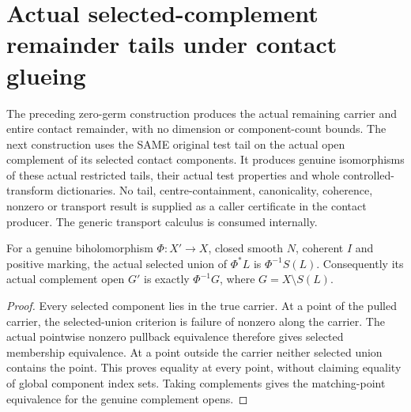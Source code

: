 \section{Actual selected-complement remainder tails under contact glueing}

The preceding zero-germ construction produces the actual remaining carrier
and entire contact remainder, with no dimension or component-count bounds.
The next construction uses the SAME original test tail on the actual open
complement of its selected contact components. It produces genuine isomorphisms
of these actual restricted tails, their actual test properties and whole
controlled-transform dictionaries. No tail, centre-containment, canonicality,
coherence, nonzero or transport result is supplied as a caller certificate
in the contact producer. The generic transport calculus is consumed internally.

\begin{theorem}
\label{hir:zero-contact-tail-selected-complement}
\leanok
{}
For a genuine biholomorphism $\Phi:X'\to X$, closed smooth $N$,
coherent $I$ and positive marking, the actual selected union of $\Phi^*L$
is $\Phi^{-1}S(L)$. Consequently its actual complement open $G'$ is exactly
$\Phi^{-1}G$, where $G=X\setminus S(L)$.
\end{theorem}
\begin{proof}
Every selected component lies in the true carrier. At a point of the pulled
carrier, the selected-union criterion is failure of nonzero along the
carrier. The actual pointwise nonzero pullback equivalence therefore gives
selected membership equivalence. At a point outside the carrier neither
selected union contains the point. This proves equality at every point,
without claiming equality of global component index sets. Taking complements
gives the matching-point equivalence for the genuine complement opens.
\end{proof}

